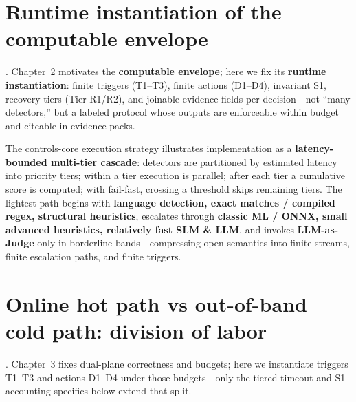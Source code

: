 \documentclass[11pt,a4paper]{report}
\begin{document}

\section{Runtime instantiation of the computable envelope}
\DecoupledSafety{}. Chapter~2 motivates the \textbf{computable envelope}; here we fix its \textbf{runtime instantiation}: finite triggers (T1--T3), finite actions (D1--D4), invariant S1, recovery tiers (Tier-R1/R2), and joinable evidence fields per decision---not ``many detectors,'' but a labeled protocol whose outputs are enforceable within budget and citeable in evidence packs.

The controls-core execution strategy illustrates implementation as a \textbf{latency-bounded multi-tier cascade}: detectors are partitioned by estimated latency into priority tiers; within a tier execution is parallel; after each tier a cumulative score is computed; with fail-fast, crossing a threshold skips remaining tiers. The lightest path begins with \textbf{language detection, exact matches / compiled regex, structural heuristics}, escalates through \textbf{classic ML / ONNX, small advanced heuristics, relatively fast SLM \& LLM}, and invokes \textbf{LLM-as-Judge} only in borderline bands—compressing open semantics into finite streams, finite escalation paths, and finite triggers.

\section{Online hot path vs out-of-band cold path: division of labor}
\ControlPlane{}. Chapter~3 fixes dual-plane correctness and budgets; here we instantiate triggers T1--T3 and actions D1--D4 under those budgets---only the tiered-timeout and S1 accounting specifics below extend that split.
\end{document}
